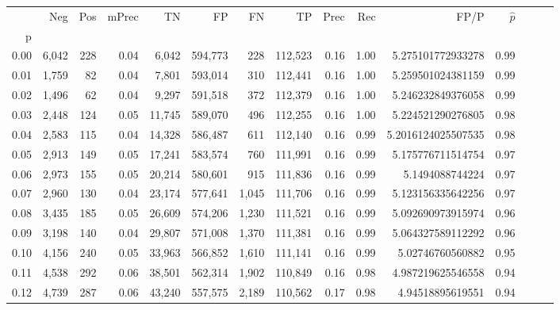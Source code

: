 \begin{tabular}{rrrrrrrrrrrrrrr}
\toprule
{} &     Neg &    Pos & mPrec &       TN &       FP &       FN &       TP &  Prec &   Rec &                  FP/P & $\hat{p}$ \\
p    &         &        &       &          &          &          &          &       &       &                       &           \\
\midrule
0.00 &   6,042 &    228 &  0.04 &    6,042 &  594,773 &      228 &  112,523 &  0.16 &  1.00 &     5.275101772933278 &      0.99 \\
0.01 &   1,759 &     82 &  0.04 &    7,801 &  593,014 &      310 &  112,441 &  0.16 &  1.00 &     5.259501024381159 &      0.99 \\
0.02 &   1,496 &     62 &  0.04 &    9,297 &  591,518 &      372 &  112,379 &  0.16 &  1.00 &     5.246232849376058 &      0.99 \\
0.03 &   2,448 &    124 &  0.05 &   11,745 &  589,070 &      496 &  112,255 &  0.16 &  1.00 &     5.224521290276805 &      0.98 \\
0.04 &   2,583 &    115 &  0.04 &   14,328 &  586,487 &      611 &  112,140 &  0.16 &  0.99 &    5.2016124025507535 &      0.98 \\
0.05 &   2,913 &    149 &  0.05 &   17,241 &  583,574 &      760 &  111,991 &  0.16 &  0.99 &     5.175776711514754 &      0.97 \\
0.06 &   2,973 &    155 &  0.05 &   20,214 &  580,601 &      915 &  111,836 &  0.16 &  0.99 &       5.1494088744224 &      0.97 \\
0.07 &   2,960 &    130 &  0.04 &   23,174 &  577,641 &    1,045 &  111,706 &  0.16 &  0.99 &     5.123156335642256 &      0.97 \\
0.08 &   3,435 &    185 &  0.05 &   26,609 &  574,206 &    1,230 &  111,521 &  0.16 &  0.99 &     5.092690973915974 &      0.96 \\
0.09 &   3,198 &    140 &  0.04 &   29,807 &  571,008 &    1,370 &  111,381 &  0.16 &  0.99 &     5.064327589112292 &      0.96 \\
0.10 &   4,156 &    240 &  0.05 &   33,963 &  566,852 &    1,610 &  111,141 &  0.16 &  0.99 &      5.02746760560882 &      0.95 \\
0.11 &   4,538 &    292 &  0.06 &   38,501 &  562,314 &    1,902 &  110,849 &  0.16 &  0.98 &     4.987219625546558 &      0.94 \\
0.12 &   4,739 &    287 &  0.06 &   43,240 &  557,575 &    2,189 &  110,562 &  0.17 &  0.98 &      4.94518895619551 &      0.94 \\

\end{tabular}
